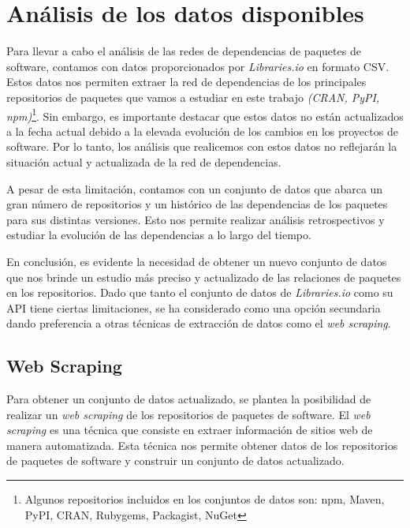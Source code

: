 

\section{Análisis de los datos disponibles}

Para llevar a cabo el análisis de las redes de dependencias de paquetes de software, contamos con 
datos proporcionados por \textit{Libraries.io}\cite{jeremy_katz_2020_3626071} en formato CSV. Estos 
datos nos permiten extraer la red de dependencias de los principales repositorios de paquetes que 
vamos a estudiar en este trabajo
\textit{(CRAN, PyPI, npm)}\footnote{Algunos repositorios incluidos en los conjuntos de datos 
son: npm, Maven, PyPI, CRAN, Rubygems, Packagist, NuGet}. Sin embargo,
es importante destacar que estos datos no están actualizados a la fecha actual debido a la
elevada evolución de los cambios en los proyectos de software. Por lo tanto, los análisis que
realicemos con estos datos no reflejarán la situación actual y actualizada de la red de dependencias.

A pesar de esta limitación, contamos con un conjunto de datos que abarca un gran número de repositorios
y un histórico de las dependencias de los paquetes para sus distintas versiones. Esto nos permite
realizar análisis retrospectivos y estudiar la evolución de las dependencias a lo largo del
tiempo.

En conclusión, es evidente la necesidad de obtener un nuevo conjunto de datos que nos brinde
un estudio más preciso y actualizado de las relaciones de paquetes en los repositorios. Dado
que tanto el conjunto de datos de \textit{Libraries.io} como su API tiene ciertas limitaciones, se ha considerado como una opción
secundaria dando preferencia a otras técnicas de extracción de datos como el \textit{web scraping}.

\subsection{Web Scraping}

Para obtener un conjunto de datos actualizado, se plantea la posibilidad de realizar un
\textit{web scraping} de los repositorios de paquetes de software. El \textit{web scraping}
es una técnica que consiste en extraer información de sitios web de manera automatizada.
Esta técnica nos permite obtener datos de los repositorios de paquetes de software y
construir un conjunto de datos actualizado.

